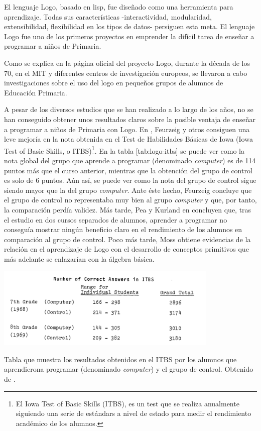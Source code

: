 El lenguaje Logo, basado en \Gls{lisp}, fue diseñado como una herramienta para aprendizaje. Todas sus características -interactividad, modularidad, extensibilidad, flexibilidad en los tipos de datos- persiguen esta meta. El lenguaje Logo fue uno de los primeros proyectos en emprender la difícil tarea de enseñar a programar a niños de Primaria.

{\color{blue}
Como se explica en la página oficial del proyecto Logo\cite{logo}, durante la década de los 70, en el \acrfull{MIT} y diferentes centros de investigación europeos, se llevaron a cabo investigaciones sobre el uso del \Gls{logo} en pequeños grupos de alumnos de Educación Primaria. 

A pesar de los diversos estudios que se han realizado a lo largo de los años, no se han conseguido obtener unos resultados claros sobre la posible ventaja de enseñar a programar a niños de Primaria con Logo. En \cite{feurzeig1969programming}, Feurzeig y otros consiguen una leve mejoría en la nota obtenida en el Test de Habilidades Básicas de Iowa (Iowa Test of Basic Skills, o ITBS)\footnote{El Iowa Test of Basic Skills (ITBS), es un test que se realiza anualmente siguiendo una serie de estándars a nivel de estado para medir el rendimiento académico de los alumnos.}. En la tabla \ref{tab:logo-itbs} se puede ver como la nota global del grupo que aprende a programar (denominado \emph{computer}) es de 114 puntos más que el curso anterior, mientras que la obtención del grupo de control es solo de 6 puntos. Aún así, se puede ver como la nota del grupo de control sigue siendo mayor que la del grupo \emph{computer}. Ante éste hecho, Feurzeig concluye que el grupo de control no representaba muy bien al grupo \emph{computer} y que, por tanto, la comparación perdía validez.
Más tarde, Pea y Kurland en \cite{pea1984logo} concluyen que, tras el estudio en dos cursos separados de alumnos, aprender a programar no conseguía mostrar ningún beneficio claro en el rendimiento de los alumnos en comparación al grupo de control.
Poco más tarde, Moss \cite{moss1985creating} obtiene evidencias de la relación en el aprendizaje de Logo con el desarrollo de conceptos primitivos que más adelante se enlazarían con la álgebra básica. 
}

\begin{table}[!ht]
	\begin{centering}
		\includegraphics[width=0.8\textwidth]{images/logo-itbs.png}
			\caption{Tabla que muestra los resultados obtenidos en el ITBS por los alumnos que aprendierona programar (denominado \emph{computer}) y el grupo de control. Obtenido de \cite{feurzeig1969programming}.}
				\label{tab:logo-itbs}
	\end{centering}
\end{table}


